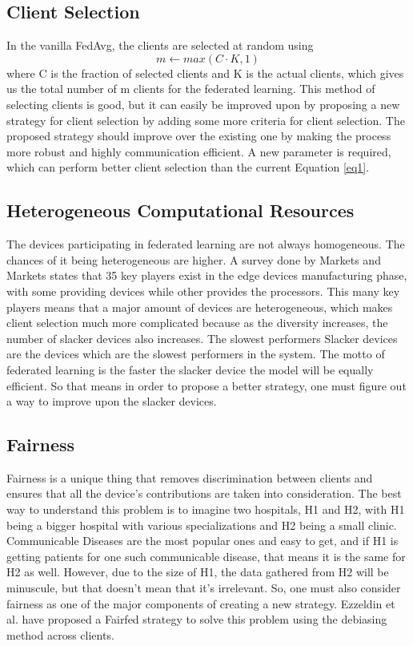 \documentclass[conference]{IEEEtran}
\begin{document}
\subsection{Client Selection}

In the vanilla FedAvg, the clients are selected at random using 
\begin{equation}
 m \gets max(C\cdot K,1)
 \label{eq1}
 \end{equation}
where C is the fraction of selected clients and K is the actual clients, which gives us the total number of m clients for the federated learning. This method of selecting clients is good, but it can easily be improved upon by proposing a new strategy for client selection by adding some more criteria for client selection. The proposed strategy should improve over the existing one by making the process more robust and highly communication efficient. A new parameter is required, which can perform better client selection than the current Equation \ref{eq1}.  

\subsection{Heterogeneous Computational Resources}
The devices participating in federated learning are not always homogeneous. The chances of it being heterogeneous are higher. A survey done by Markets and Markets \cite{market} states that 35 key players exist in the edge devices manufacturing phase, with some providing devices while other provides the processors. This many key players means that a major amount of devices are heterogeneous, which makes client selection much more complicated because as the diversity increases, the number of slacker devices also increases. The slowest performers Slacker devices are the devices which are the slowest performers in the system. The motto of federated learning is the faster the slacker device the model will be equally efficient. So that means in order to propose a better strategy, one must figure out a way to improve upon the slacker devices. 

\subsection{Fairness}
Fairness is a unique thing that removes discrimination between clients and ensures that all the device's contributions are taken into consideration. The best way to understand this problem is to imagine two hospitals, H1 and H2, with H1 being a bigger hospital with various specializations and H2 being a small clinic. Communicable Diseases are the most popular ones and easy to get, and if H1 is getting patients for one such communicable disease, that means it is the same for H2 as well. However, due to the size of H1, the data gathered from H2 will be minuscule, but that doesn't mean that it's irrelevant. So, one must also consider fairness as one of the major components of creating a new strategy. Ezzeldin et al. \cite{ezzeldin2023fairfed} have proposed a Fairfed strategy to solve this problem using the debiasing method across clients.
 
\end{document}
